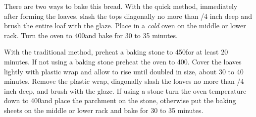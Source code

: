 \begin{IngredientsAndSteps}
    \ListIngredientsAndSteps
    {}
    {
        There are two ways to bake this bread. With the quick method, immediately after forming
        the loaves, slash the tops diagonally no more than /4 inch deep and brush
        the entire loaf with the glaze. Place in a \textit{cold} oven on the middle or lower rack.
        Turn the oven to 400\Degrees[F] and bake for 30 to 35 minutes.

        With the traditional method, preheat a baking stone to 450\Degrees[F] for at least 20 minutes.
        If not using a baking stone preheat the oven to 400\Degrees[F]. Cover the loaves lightly with
        plastic wrap and allow to rise until doubled in size, about 30 to 40 minutes. Remove the
        plastic wrap, diagonally slash the loaves no more than /4 inch deep, and brush
        with the glaze. If using a stone turn the oven temperature down to 400\Degrees[F] and place
        the parchment on the stone, otherwise put the baking sheets on the middle or lower rack and
        bake for 30 to 35 minutes.
    }
\end{IngredientsAndSteps}

%
%
%
%

\newpage



